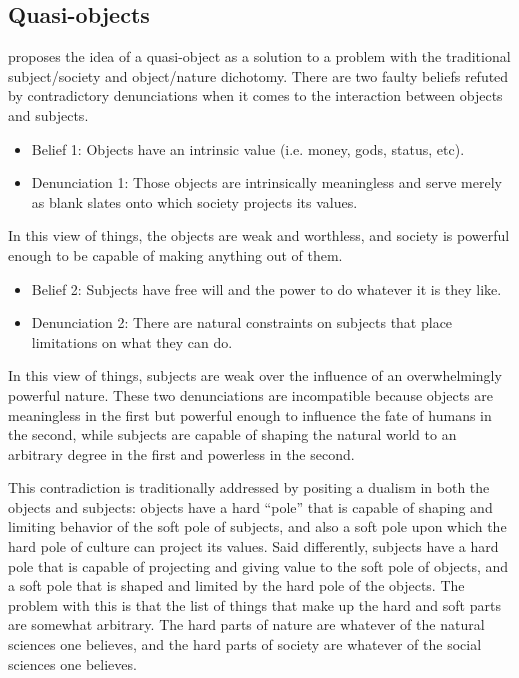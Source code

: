 \documentclass[a4paper]{article}
\begin{document}
\newpage
\begin{appendices}
\section{Quasi-objects}

\cite{latour2012we} proposes the idea of a quasi-object as a solution to a
problem with the traditional subject/society and object/nature dichotomy.
There are two faulty beliefs refuted by contradictory denunciations when it
comes to the interaction between objects and subjects.
%
\begin{itemize} \item[] Belief 1: Objects have an intrinsic value (i.e. money,
            gods, status, etc).

    \item[] Denunciation 1: Those objects are intrinsically meaningless and
        serve merely as blank slates onto which society projects its values.
\end{itemize}
%
In this view of things, the objects are weak and worthless, and society is
powerful enough to be capable of making anything out of them. 
%
\begin{itemize}
    \item[] Belief 2: Subjects have free will and the power to do whatever it
        is they like.

    \item[] Denunciation 2: There are natural constraints on subjects that
        place limitations on what they can do. 
\end{itemize}
%
In this view of things, subjects are weak over the influence of an
overwhelmingly powerful nature. These two denunciations are incompatible
because objects are meaningless in the first but powerful enough to influence
the fate of humans in the second, while subjects are capable of shaping the
natural world to an arbitrary degree in the first and powerless in the second.

This contradiction is traditionally addressed by positing a dualism in both
the objects and subjects: objects have a hard ``pole'' that is capable of
shaping and limiting behavior of the soft pole of subjects, and also a soft
pole upon which the hard pole of culture can project its values. Said
differently, subjects have a hard pole that is capable of projecting and
giving value to the soft pole of objects, and a soft pole that is shaped and
limited by the hard pole of the objects. The problem with this is that the
list of things that make up the hard and soft parts are somewhat arbitrary.
The hard parts of nature are whatever of the natural sciences one believes,
and the hard parts of society are whatever of the social sciences one
believes.


\end{appendices}
\end{document}
